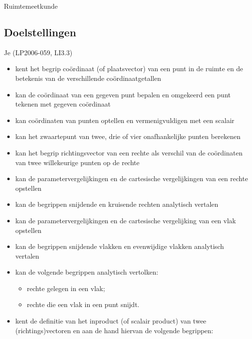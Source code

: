 \documentclass[12pt,twoside]{article}
\begin{document}
\begin{center}
  \begin{mdframed}
    \centering
    \fontsize{40}{60}\selectfont Ruimtemeetkunde
  \end{mdframed}
  \vfill
  \vfill
\end{center}

\subsection*{Doelstellingen}
\vspace*{-0.8cm}
\begin{singlespacing}
\small
Je \hfill  {\scriptsize(LP2006-059, LI3.3)}
\begin{itemize}
  \itemsep-0.3em
  \vspace*{-0.4cm}
\item kent het begrip coördinaat (of plaatsvector) van een punt in de ruimte en de betekenis van de verschillende coördinaatgetallen
\item kan de coördinaat van een gegeven punt bepalen en omgekeerd een punt tekenen met gegeven coördinaat
\item kan coördinaten van punten optellen en vermenigvuldigen met een scalair
\item kan het zwaartepunt van twee, drie of vier onafhankelijke punten berekenen
\item kan het begrip richtingsvector van een rechte als verschil van de coördinaten van twee willekeurige punten op de rechte
\item kan de parametervergelijkingen en de cartesische vergelijkingen van een rechte opstellen
\item kan de begrippen snijdende en kruisende rechten analytisch vertalen
\item kan de parametervergelijkingen en de cartesische vergelijking van een vlak opstellen
\item kan de begrippen snijdende vlakken en evenwijdige vlakken analytisch vertalen
\item kan de volgende begrippen analytisch vertolken:
  \begin{itemize}
    \itemsep-0.5em
    \vspace*{-0.2cm}
  \item rechte gelegen in een vlak;
  \item rechte die een vlak in een punt snijdt.
  \end{itemize}
\item kent de definitie van het inproduct (of scalair product) van twee (richtings)vectoren en aan de hand hiervan de volgende begrippen:

\end{itemize}
\end{singlespacing}
\end{document}
